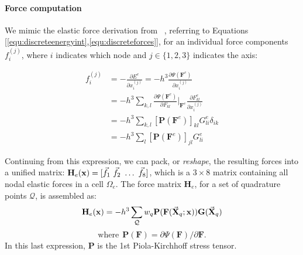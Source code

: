 \paragraph{Force computation} We mimic the elastic force derivation
from ~\cite{McAdaZSETTS:2011},
referring to Equations [\ref{equ:discreteenergyint},\ref{equ:discreteforces}], for an individual force components
$f_i^{(j)}$, where $i$ indicates which node and $j \in \{1,2,3\}$
indicates the axis:

\begin{equation}
  \begin{split}
    f_i^{(j)} &= -\frac{\partial E^e}{\partial x^{(j)}_i} =
    -h^3\frac{\partial \Psi(\bm F^e) }{\partial x^{(j)}_i} \\ &=
    -h^3\sum_{k,l}\frac{\partial \Psi(\bm F^e) }{\partial F_{kl}}\bigg|_{\bm F^e}
    \frac{\partial F^e_{kl} }{\partial x^{(j)}_i} \\
    & = -h^3\sum_{k,l}[\bm P(\bm F^e)]_{kl}G^e_{li}\delta_{ik}\\ &=
    -h^3\sum_{l}[\bm P(\bm F^e)]_{jl}G^e_{li}
  \end{split}
\end{equation}


Continuing from this expression, we can pack, or \textit{reshape}, the
resulting forces into a unified matrix:
$\mathbf{H}_e(\bvec{\mathbf x})=[\vec{f}_1\ \vec{f}_2\ \hdots\
\vec{f}_8]$, which is a $3\times 8$ matrix containing all nodal elastic forces in a
cell $\Omega_e$. The force matrix $\mathbf{H}_e$, for a set of
quadrature points $\mathcal Q$, is assembled as:
\begin{equation}
\mathbf{H}_e(\hbox{\boldmath $\mathbf x$})=-h^3 \sum_{\mathcal Q} w_q\mathbf{P}(\mathbf{F}(\vec{\mathbf X}_q;\hbox{\boldmath $\mathbf x$}))\mathbf{G}(\vec{\mathbf X}_q)
\end{equation}
$$
\mbox{where}\ \
\mbox{$\mathbf{P}(\mathbf{F})=\partial\Psi(\mathbf{F})/\partial\mathbf{F}$}.
$$
In this last expression, $\mathbf{P}$ is the 1st
Piola-Kirchhoff stress tensor.


